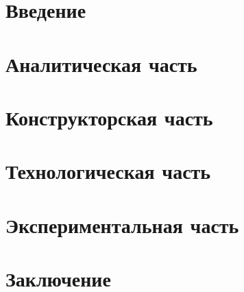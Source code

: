 \documentclass[12pt]{report}
\begin{document}
	\renewcommand\bibname{Список литературы}
	
	
	
	\tableofcontents
	\newpage
	
	\chapter*{Введение}
	
	\newpage
	
	\chapter{Аналитическая часть}
	
	\newpage
	
	\chapter{Конструкторская часть}
	\newpage
	
	\chapter{Технологическая часть}
	\newpage
	
	\chapter{Экспериментальная часть}
	\newpage
	
	\chapter*{Заключение}
	\newpage
	
\end{document}

